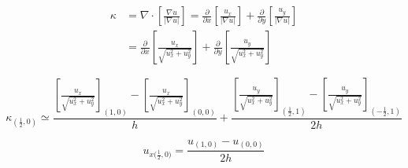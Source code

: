 \begin{equation}
\begin{split}
\kappa &= \nabla \cdot \left[\frac{\nabla u}{|\nabla u|}\right] =\frac{\partial}{\partial x}\left[\frac{u_x}{|\nabla u|}\right]+\frac{\partial}{\partial y}\left[\frac{u_y}{|\nabla u|}\right]\\
&=\frac{\partial}{\partial x}\left[\frac{u_x}{\sqrt{u_x^2+u_y^2}}\right]+\frac{\partial}{\partial y}\left[\frac{u_y}{\sqrt{u_x^2+u_y^2}}\right]
\end{split}
\end{equation}

\begin{equation}
\kappa_{(\frac{1}{2},0)} \simeq \frac{\left[\frac{u_x}{\sqrt{u_x^2+u_y^2}}\right]_{(1,0)}-\left[\frac{u_x}{\sqrt{u_x^2+u_y^2}}\right]_{(0,0)}}{h}+\frac{\left[\frac{u_y}{\sqrt{u_x^2+u_y^2}}\right]_{(\frac{1}{2},1)}-\left[\frac{u_y}{\sqrt{u_x^2+u_y^2}}\right]_{(-\frac{1}{2},1)}}{2h}
\end{equation}

\begin{equation}
u_{x{(\frac{1}{2},0})} =  \frac{u_{(1,0)}-u_{(0,0)}}{2h}
\end{equation}